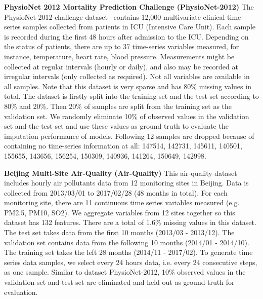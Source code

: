\documentclass{article}
\begin{document}
\textbf{PhysioNet 2012 Mortality Prediction Challenge (PhysioNet-2012)} \hspace{1em} 
The PhysioNet 2012 challenge dataset~\cite{Goldberger2000PhysioNet} contains 12,000 multivariate clinical time-series samples collected from patients in ICU (Intensive Care Unit). Each sample is recorded during the first 48 hours after admission to the ICU. Depending on the status of patients, there are up to 37 time-series variables measured, for instance, temperature, heart rate, blood pressure. Measurements might be collected at regular intervals (hourly or daily), and also may be recorded at irregular intervals (only collected as required). Not all variables are available in all samples. Note that this dataset is very sparse and has 80\% missing values in total. The dataset is firstly split into the training set and the test set according to 80\% and 20\%. Then 20\% of samples are split from the training set as the validation set. We randomly eliminate 10\% of observed values in the validation set and the test set and use these values as ground truth to evaluate the imputation performance of models. Following 12 samples are dropped because of containing no time-series information at all: 147514, 142731, 145611, 140501, 155655, 143656, 156254, 150309, 140936, 141264, 150649, 142998.

\textbf{Beijing Multi-Site Air-Quality (Air-Quality)}\hspace{1em} 
This air-quality dataset~\cite{Zhang2017AirQuality} includes hourly air pollutants data from 12 monitoring sites in Beijing. Data is collected from 2013/03/01 to 2017/02/28 (48 months in total). For each monitoring site, there are 11 continuous time series variables measured (e.g. PM2.5, PM10, SO2). We aggregate variables from 12 sites together so this dataset has 132 features. There are a total of 1.6\% missing values in this dataset. The test set takes data from the first 10 months (2013/03 - 2013/12). The validation set contains data from the following 10 months (2014/01 - 2014/10). The training set takes the left 28 months (2014/11 - 2017/02). To generate time series data samples, we select every 24 hours data, i.e. every 24 consecutive steps, as one sample. Similar to dataset PhysioNet-2012, 10\% observed values in the validation set and test set are eliminated and held out as ground-truth for evaluation.
\end{document}
